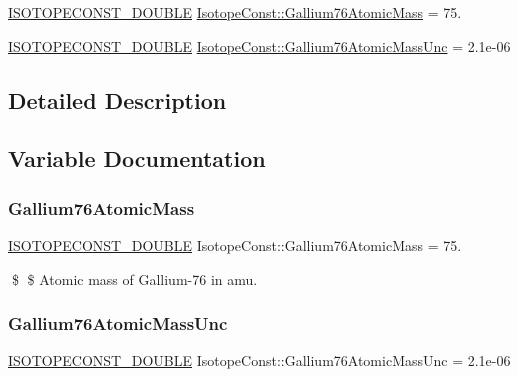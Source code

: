 \begin{DoxyCompactItemize}
\item 
\mbox{\hyperlink{group___isotope_const-_macros_ga8f45a7272ce02c0b4c65c44636ed719a}{I\+S\+O\+T\+O\+P\+E\+C\+O\+N\+S\+T\+\_\+\+D\+O\+U\+B\+LE}} \mbox{\hyperlink{group___isotope_const-_gallium-_ga76_ga20fb7c6121c10b342a47570331d690f6}{Isotope\+Const\+::\+Gallium76\+Atomic\+Mass}} = 75.
\item 
\mbox{\hyperlink{group___isotope_const-_macros_ga8f45a7272ce02c0b4c65c44636ed719a}{I\+S\+O\+T\+O\+P\+E\+C\+O\+N\+S\+T\+\_\+\+D\+O\+U\+B\+LE}} \mbox{\hyperlink{group___isotope_const-_gallium-_ga76_gaa79796328e1bd1c6e7b82d8458ad3d12}{Isotope\+Const\+::\+Gallium76\+Atomic\+Mass\+Unc}} = 2.\+1e-\/06
\end{DoxyCompactItemize}


\subsection{Detailed Description}


\subsection{Variable Documentation}
\mbox{\label{group___isotope_const-_gallium-_ga76_ga20fb7c6121c10b342a47570331d690f6}} 
\subsubsection{\texorpdfstring{Gallium76\+Atomic\+Mass}{Gallium76AtomicMass}}
{\footnotesize\ttfamily \mbox{\hyperlink{group___isotope_const-_macros_ga8f45a7272ce02c0b4c65c44636ed719a}{I\+S\+O\+T\+O\+P\+E\+C\+O\+N\+S\+T\+\_\+\+D\+O\+U\+B\+LE}} Isotope\+Const\+::\+Gallium76\+Atomic\+Mass = 75.}

\$ \$ Atomic mass of Gallium-\/76 in amu. \mbox{\label{group___isotope_const-_gallium-_ga76_gaa79796328e1bd1c6e7b82d8458ad3d12}} 
\subsubsection{\texorpdfstring{Gallium76\+Atomic\+Mass\+Unc}{Gallium76AtomicMassUnc}}
{\footnotesize\ttfamily \mbox{\hyperlink{group___isotope_const-_macros_ga8f45a7272ce02c0b4c65c44636ed719a}{I\+S\+O\+T\+O\+P\+E\+C\+O\+N\+S\+T\+\_\+\+D\+O\+U\+B\+LE}} Isotope\+Const\+::\+Gallium76\+Atomic\+Mass\+Unc = 2.\+1e-\/06}

